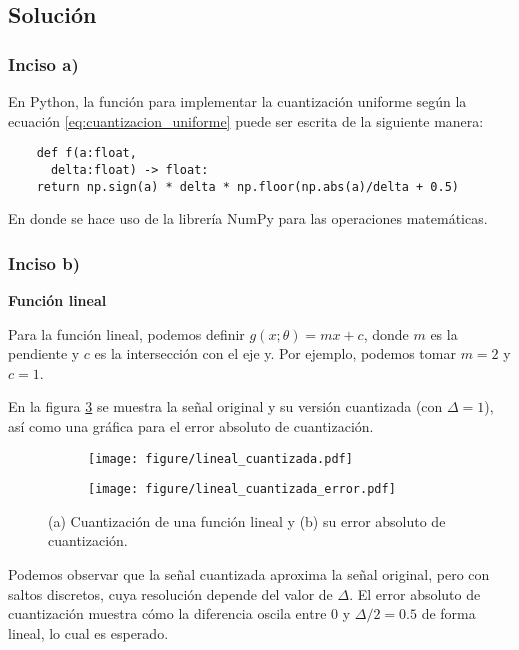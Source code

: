 \documentclass[paper=letter, fontsize=11pt, draft=false]{scrartcl}
\numberwithin{equation}{problemcounter} %
\numberwithin{figure}{problemcounter} %
\numberwithin{table}{problemcounter} %
\numberwithin{subsection}{problemcounter}
\begin{document}
\subsection{Solución}

\subsubsection{Inciso a)}
En Python, la función para implementar la cuantización uniforme según la ecuación \ref{eq:cuantizacion_uniforme} puede ser escrita de la siguiente manera:
\begin{verbatim}
    def f(a:float,
      delta:float) -> float:
    return np.sign(a) * delta * np.floor(np.abs(a)/delta + 0.5)
\end{verbatim}

En donde se hace uso de la librería NumPy para las operaciones matemáticas.


\subsubsection{Inciso b)}

\textbf{Función lineal}

Para la función lineal, podemos definir $g(x; \theta) = mx + c$, donde $m$ es la pendiente y $c$ es la intersección con el eje y. Por ejemplo, podemos tomar $m = 2$ y $c = 1$. 

En la figura \ref{fig:lineal} se muestra la señal original y su versión cuantizada (con $\Delta = 1$), así como una gráfica para el error absoluto de cuantización. 

\begin{figure}
    \centering
    \begin{subfigure}[b]{0.8\linewidth}
        \centering
        \texttt{[image: figure/lineal\_cuantizada.pdf]}
        \caption{}
        \label{fig:lineal_a}
    \end{subfigure}
    \vspace{0.5cm}
    \begin{subfigure}[b]{0.8\linewidth}
        \centering
        \texttt{[image: figure/lineal\_cuantizada\_error.pdf]}
        \caption{}
        \label{fig:lineal_b}
    \end{subfigure}
    \caption{(a) Cuantización de una función lineal y (b) su error absoluto de cuantización.}
    \label{fig:lineal}
\end{figure}

Podemos observar que la señal cuantizada aproxima la señal original, pero con saltos discretos, cuya resolución depende del valor de $\Delta$. El error absoluto de cuantización muestra cómo la diferencia oscila entre 0 y $\Delta/2 = 0.5$ de forma lineal, lo cual es esperado.
\end{document}
